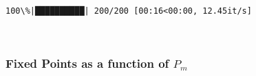 \documentclass[11pt]{article}
\begin{document}
    \begin{Verbatim}[commandchars=\\\{\}]
100\%|██████████| 200/200 [00:16<00:00, 12.45it/s]
    \end{Verbatim}

    \begin{center}
    \end{center}
    { \hspace*{\fill} \\}
    
    \hypertarget{fixed-points-as-a-function-of-p_m}{%
\subsubsection{\texorpdfstring{Fixed Points as a function of
\(P_m\)}{Fixed Points as a function of P\_m}}\label{fixed-points-as-a-function-of-p_m}}
\end{document}

